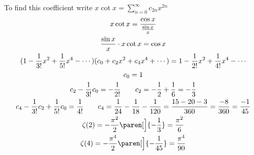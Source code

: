 To find this coefficient write $x\cot x=\sum_{n=0}^\infty c_{2n}x^{2n}$
\begin{gather*}
x\cot x = \frac{\cos x}{\frac{\sin x}{x}} \\
\frac{\sin x}{x}\cdot x\cot x = \cos x \\
(1-\frac1{3!}x^2+\frac1{5!}x^4-\dotsb)(c_0+c_2x^2+c_4x^4+\dotsb) = 1 - \frac{1}{2!}x^2 + \frac{1}{4!}x^4 - \dotsb \\
c_0 = 1 \\
c_2 - \frac1{3!}c_0 = -\frac1{2!} \qquad c_2 = -\frac12 + \frac16 = -\frac13 \\
c_4 - \frac1{3!}c_2 + \frac1{5!}c_0 = \frac1{4!} \qquad c_4 = \frac1{24}-\frac1{18}-\frac1{120} = \frac{15-20-3}{360} = \frac{-8}{360} = \frac{-1}{45} \\
\zeta(2) = -\frac{\pi^2}{2}\paren[\Big]{-\frac{1}{3}} = \frac{\pi^2}{6} \\
\zeta(4) = -\frac{\pi^4}{2}\paren[\Big]{-\frac{1}{45}} = \frac{\pi^4}{90}
\end{gather*}
